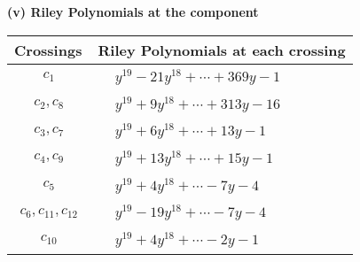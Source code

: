 \documentclass[1p]{elsarticle_modified}
\theoremstyle{definition}
\begin{document}
\newpage\renewcommand{\arraystretch}{1}
\flushleft \textbf{(v) Riley Polynomials at the component}\newline \\
\begin{tabular}{m{50pt}|m{274pt}}
Crossings & \hspace{64pt}Riley Polynomials at each crossing \\
\hline $$\begin{aligned}c_{1}\end{aligned}$$&$\begin{aligned}
&y^{19}-21 y^{18}+\cdots+369 y-1
\end{aligned}$\\
\hline $$\begin{aligned}c_{2},c_{8}\end{aligned}$$&$\begin{aligned}
&y^{19}+9 y^{18}+\cdots+313 y-16
\end{aligned}$\\
\hline $$\begin{aligned}c_{3},c_{7}\end{aligned}$$&$\begin{aligned}
&y^{19}+6 y^{18}+\cdots+13 y-1
\end{aligned}$\\
\hline $$\begin{aligned}c_{4},c_{9}\end{aligned}$$&$\begin{aligned}
&y^{19}+13 y^{18}+\cdots+15 y-1
\end{aligned}$\\
\hline $$\begin{aligned}c_{5}\end{aligned}$$&$\begin{aligned}
&y^{19}+4 y^{18}+\cdots-7 y-4
\end{aligned}$\\
\hline $$\begin{aligned}c_{6},c_{11},c_{12}\end{aligned}$$&$\begin{aligned}
&y^{19}-19 y^{18}+\cdots-7 y-4
\end{aligned}$\\
\hline $$\begin{aligned}c_{10}\end{aligned}$$&$\begin{aligned}
&y^{19}+4 y^{18}+\cdots-2 y-1
\end{aligned}$\\
\hline
\end{tabular}\\~\\
\end{document}
